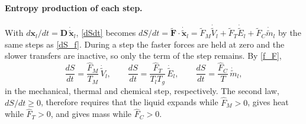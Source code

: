 \paragraph{Entropy production of each step.}
With $d\boldsymbol{x}_l/dt=\boldsymbol{D}\,\dot{\tilde{\boldsymbol{x}}}_l$, \eqref{dSdt} becomes $dS/dt=\tilde{\boldsymbol{F}}\cdot\dot{\tilde{\boldsymbol{x}}}_l=\tilde{F}_M\dot{\tilde{V}}_l+\tilde{F}_T\dot{\tilde{E}}_l+\tilde{F}_C\dot{\tilde{m}}_l$ by the same steps as \eqref{dS_f}. During a step the faster forces are held at zero and the slower transfers are inactive, so only the term of the step remains. By \eqref{f_F},
\begin{equation}\label{dSdt_steps}
\frac{dS}{dt}=\frac{\hat{F}_M}{T_M}\,\dot{\tilde{V}}_l,\qquad
\frac{dS}{dt}=\frac{\hat{F}_T}{T_lT_g}\,\dot{\tilde{E}}_l,\qquad
\frac{dS}{dt}=\frac{\hat{F}_C}{T}\,\dot{\tilde{m}}_l,
\end{equation}
in the mechanical, thermal and chemical step, respectively. The second law, $dS/dt\ge0$, therefore requires that the liquid expands while $\hat{F}_M>0$, gives heat while $\hat{F}_T>0$, and gives mass while $\hat{F}_C>0$.

